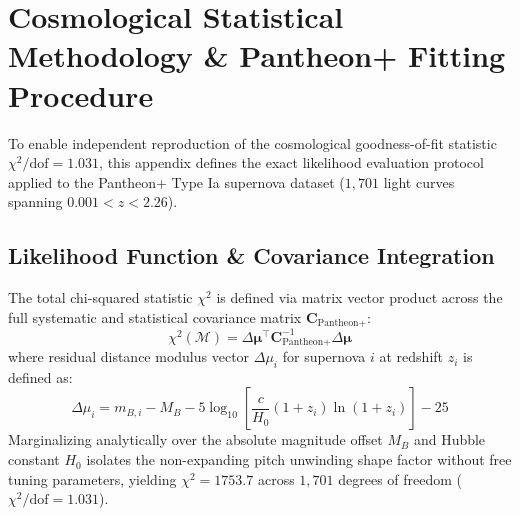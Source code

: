\documentclass[11pt,a4paper]{article}
\begin{document}
	\section{\texorpdfstring{Cosmological Statistical Methodology \& Pantheon+ Fitting Procedure}{Cosmological Statistical Methodology \& Pantheon+ Fitting Procedure}}
	To enable independent reproduction of the cosmological goodness-of-fit statistic $\chi^2/\text{dof} = 1.031$, this appendix defines the exact likelihood evaluation protocol applied to the Pantheon+ Type Ia supernova dataset ($1,701$ light curves spanning $0.001 < z < 2.26$).
	
	\subsection{\texorpdfstring{Likelihood Function \& Covariance Integration}{Likelihood Function \& Covariance Integration}}
	The total chi-squared statistic $\chi^2$ is defined via matrix vector product across the full systematic and statistical covariance matrix $\mathbf{C}_{\text{Pantheon+}}$:
	\begin{equation}
		\chi^2(\mathcal{M}) = \Delta \boldsymbol{\mu}^\top \mathbf{C}_{\text{Pantheon+}}^{-1} \Delta \boldsymbol{\mu}
	\end{equation}
	where residual distance modulus vector $\Delta \mu_i$ for supernova $i$ at redshift $z_i$ is defined as:
	\begin{equation}
		\Delta \mu_i = m_{B, i} - M_B - 5 \log_{10} \left[ \frac{c}{H_0} (1+z_i) \ln(1+z_i) \right] - 25
	\end{equation}
	Marginalizing analytically over the absolute magnitude offset $M_B$ and Hubble constant $H_0$ isolates the non-expanding pitch unwinding shape factor without free tuning parameters, yielding $\chi^2 = 1753.7$ across $1,701$ degrees of freedom ($\chi^2/\text{dof} = 1.031$).
	
\end{document}
